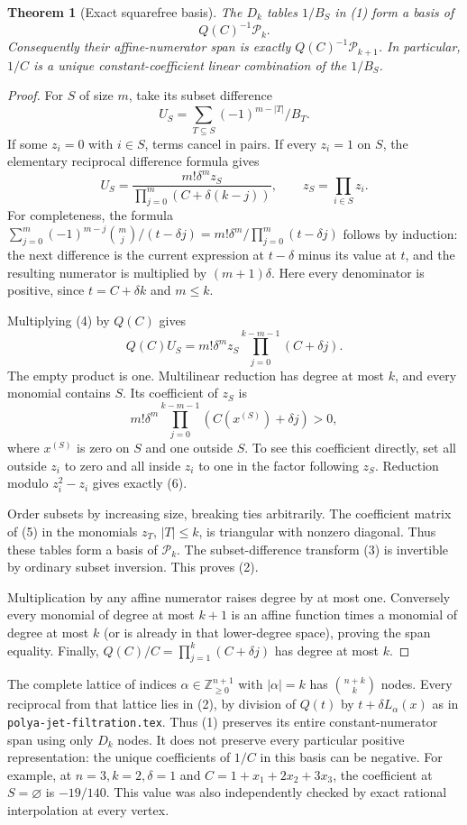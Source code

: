 \documentclass[11pt]{article}
\newtheorem{theorem}{Theorem}
\begin{document}
\begin{theorem}[Exact squarefree basis]
The $D_k$ tables $1/B_S$ in (1) form a basis of
\[
                 Q(C)^{-1}\mathcal P_k.
 \tag{2}
\]
Consequently their affine-numerator span is exactly
$Q(C)^{-1}\mathcal P_{k+1}$. In particular, $1/C$ is a unique
constant-coefficient linear combination of the $1/B_S$.
\end{theorem}
\begin{proof}
For $S$ of size $m$, take its subset difference
\[
 U_S=\sum_{T\subseteq S}(-1)^{m-|T|}/B_T.
 \tag{3}
\]
If some $z_i=0$ with $i\in S$, terms cancel in pairs. If every
$z_i=1$ on $S$, the elementary reciprocal difference formula gives
\[
 U_S=\frac{m!\delta^m z_S}
                {\prod_{j=0}^m(C+\delta(k-j))},\qquad
 z_S=\prod_{i\in S}z_i.
 \tag{4}
\]
For completeness, the formula
$\sum_{j=0}^m(-1)^{m-j}\binom mj/(t-\delta j)
=m!\delta^m/\prod_{j=0}^m(t-\delta j)$ follows by induction:
the next difference is the current expression at $t-\delta$
minus its value at $t$, and the resulting numerator is multiplied
by $(m+1)\delta$. Here every denominator is positive, since
$t=C+\delta k$ and $m\le k$.

Multiplying (4) by $Q(C)$ gives
\[
 Q(C)U_S=m!\delta^m z_S
                 \prod_{j=0}^{k-m-1}(C+\delta j).
 \tag{5}
\]
The empty product is one. Multilinear reduction has degree at most
$k$, and every monomial contains $S$. Its coefficient of $z_S$ is
\[
 m!\delta^m\prod_{j=0}^{k-m-1}
                  (C(x^{(S)})+\delta j)>0,
 \tag{6}
\]
where $x^{(S)}$ is zero on $S$ and one outside $S$. To see this
coefficient directly, set all outside $z_i$ to zero and all inside
$z_i$ to one in the factor following $z_S$. Reduction modulo
$z_i^2-z_i$ gives exactly (6).

Order subsets by increasing size, breaking ties arbitrarily. The
coefficient matrix of (5) in the monomials $z_T$, $|T|\le k$, is
triangular with nonzero diagonal. Thus these tables form a basis
of $\mathcal P_k$. The subset-difference transform (3) is invertible
by ordinary subset inversion. This proves (2).

Multiplication by any affine numerator raises degree by at most
one. Conversely every monomial of degree at most $k+1$ is an
affine function times a monomial of degree at most $k$ (or is
already in that lower-degree space), proving the span equality.
Finally, $Q(C)/C=\prod_{j=1}^k(C+\delta j)$ has degree at most $k$.
\end{proof}

The complete lattice of indices $\alpha\in\mathbb Z_{\ge0}^{n+1}$
with $|\alpha|=k$ has $\binom{n+k}{k}$ nodes. Every reciprocal
from that lattice lies in (2), by division of $Q(t)$ by
$t+\delta L_\alpha(x)$ as in \texttt{polya-jet-filtration.tex}.
Thus (1) preserves its entire constant-numerator span using only
$D_k$ nodes. It does not preserve every particular positive
representation: the unique coefficients of $1/C$ in this basis
can be negative. For example, at $n=3,k=2,\delta=1$ and
$C=1+x_1+2x_2+3x_3$, the coefficient at $S=\varnothing$ is
$-19/140$. This value was also independently checked by exact
rational interpolation at every vertex.
\end{document}
